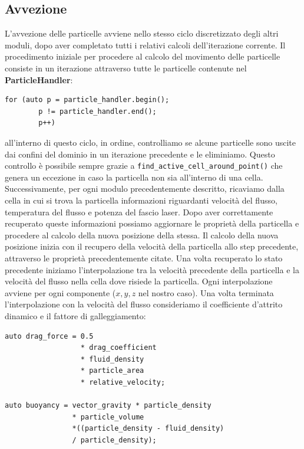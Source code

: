         \subsection{Avvezione}
        L'avvezione delle particelle avviene nello stesso ciclo discretizzato degli altri moduli, dopo aver completato tutti i relativi calcoli dell'iterazione corrente.
        Il procedimento iniziale per procedere al calcolo del movimento delle particelle consiste in un iterazione attraverso tutte le particelle contenute nel \textbf{ParticleHandler}:
        \begin{verbatim}
for (auto p = particle_handler.begin();
        p != particle_handler.end();
        p++)
        \end{verbatim}
        all'interno di questo ciclo, in ordine, controlliamo se alcune particelle sono uscite dai confini del dominio in un iterazione precedente e le eliminiamo.
        Questo controllo è possibile sempre grazie a \texttt{find\_active\_cell\_around\_point()} che genera un eccezione in caso la particella non sia all'interno di una cella.
        Successivamente, per ogni modulo precedentemente descritto, ricaviamo dalla cella in cui si trova la particella informazioni riguardanti velocità del flusso, temperatura del flusso e
        potenza del fascio laser. Dopo aver correttamente recuperato queste informazioni possiamo aggiornare le proprietà della particella e procedere al calcolo della nuova posizione della stessa.
        Il calcolo della nuova posizione inizia con il recupero della velocità della particella allo step precedente, attraverso le proprietà precedentemente citate. Una volta recuperato lo stato precedente
        iniziamo l'interpolazione tra la velocità precedente della particella e la velocità del flusso nella cella dove risiede la particella. Ogni interpolazione avviene per ogni componente
        (\begin{math}
        x,y,z
        \end{math} nel nostro caso).
        Una volta terminata l'interpolazione con la velocità del flusso consideriamo il coefficiente d'attrito dinamico e il fattore di galleggiamento:
        \begin{verbatim}
auto drag_force = 0.5
                  * drag_coefficient
                  * fluid_density
                  * particle_area
                  * relative_velocity;

auto buoyancy = vector_gravity * particle_density
                * particle_volume
                *((particle_density - fluid_density)
                / particle_density);
        \end{verbatim}
